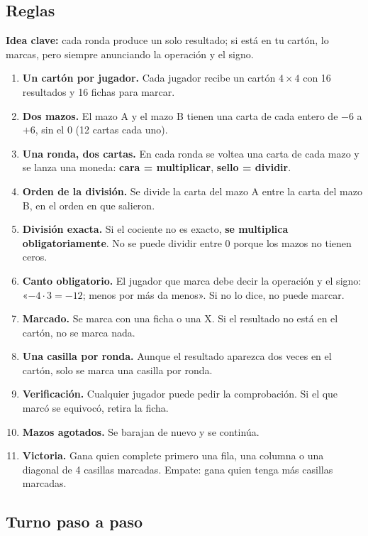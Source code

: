 \documentclass[12pt, letterpaper]{article}
\begin{document}
\subsection{Reglas}

\textbf{Idea clave:} cada ronda produce un solo resultado; si está en tu cartón, lo marcas, pero siempre anunciando la operación y el signo.

\begin{enumerate}[leftmargin=*]
  \item \textbf{Un cartón por jugador.} Cada jugador recibe un cartón $4\times 4$ con 16 resultados y 16 fichas para marcar.
  \item \textbf{Dos mazos.} El mazo A y el mazo B tienen una carta de cada entero de $-6$ a $+6$, sin el $0$ (12 cartas cada uno).
  \item \textbf{Una ronda, dos cartas.} En cada ronda se voltea una carta de cada mazo y se lanza una moneda: \textbf{cara = multiplicar}, \textbf{sello = dividir}.
  \item \textbf{Orden de la división.} Se divide la carta del mazo A entre la carta del mazo B, en el orden en que salieron.
  \item \textbf{División exacta.} Si el cociente no es exacto, \textbf{se multiplica obligatoriamente}. No se puede dividir entre $0$ porque los mazos no tienen ceros.
  \item \textbf{Canto obligatorio.} El jugador que marca debe decir la operación y el signo: «$-4\cdot 3=-12$; menos por más da menos». Si no lo dice, no puede marcar.
  \item \textbf{Marcado.} Se marca con una ficha o una X. Si el resultado no está en el cartón, no se marca nada.
  \item \textbf{Una casilla por ronda.} Aunque el resultado aparezca dos veces en el cartón, solo se marca una casilla por ronda.
  \item \textbf{Verificación.} Cualquier jugador puede pedir la comprobación. Si el que marcó se equivocó, retira la ficha.
  \item \textbf{Mazos agotados.} Se barajan de nuevo y se continúa.
  \item \textbf{Victoria.} Gana quien complete primero una fila, una columna o una diagonal de 4 casillas marcadas. Empate: gana quien tenga más casillas marcadas.
\end{enumerate}

\subsection{Turno paso a paso}
\end{document}
